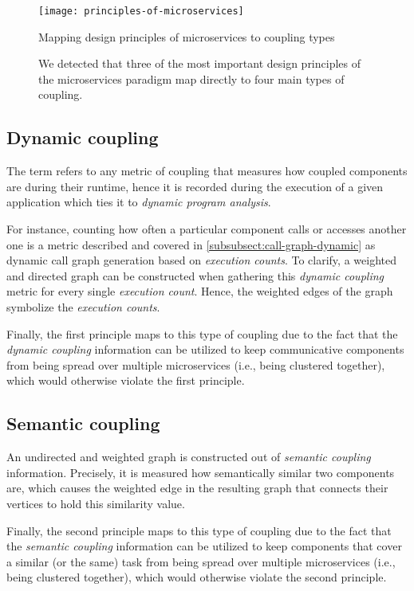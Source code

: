 \documentclass[12pt,a4paper]{report}
\begin{document}
\begin{figure}[htbp]
\centering
\texttt{[image: principles-of-microservices]}
\caption{Mapping design principles of microservices to coupling types}
\caption*{\centering
  We detected that three of the most important design principles of the
  microservices paradigm map directly to four main types of coupling.
}
\label{fig:principles-of-microservices}
\end{figure}


\subsection{Dynamic coupling}

The term refers to any metric of coupling that measures how coupled components
are during their runtime, hence it is recorded during the execution of a given
application which ties it to \textit{dynamic program analysis}.

For instance, counting how often a particular component calls or accesses
another one is a metric described and covered in
\ref{subsubsect:call-graph-dynamic} as dynamic call graph generation based on
\textit{execution counts}.
To clarify, a weighted and directed graph can be constructed when gathering
this \textit{dynamic coupling} metric for every single \textit{execution count}.
Hence, the weighted edges of the graph symbolize the \textit{execution counts}.

Finally, the first principle maps to this type of coupling due to the fact that
the \textit{dynamic coupling} information can be utilized to keep communicative
components from being spread over multiple microservices (i.e., being clustered
together), which would otherwise violate the first principle.


\subsection{Semantic coupling}

An undirected and weighted graph is constructed out of \textit{semantic
coupling} information. Precisely, it is measured how semantically similar two
components are, which causes the weighted edge in the resulting graph that
connects their vertices to hold this similarity value.

Finally, the second principle maps to this type of coupling due to the fact
that the \textit{semantic coupling} information can be utilized to keep
components that cover a similar (or the same) task from being spread over
multiple microservices (i.e., being clustered together), which would otherwise
violate the second principle.
\end{document}
